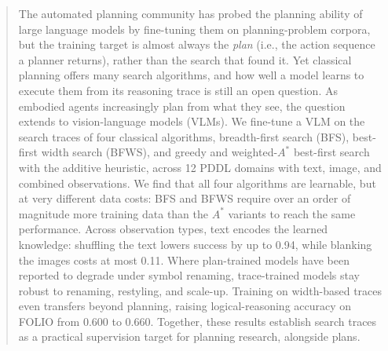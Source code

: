 \begin{abstract}
The automated planning community has probed the planning ability of large language models by fine-tuning them on planning-problem corpora, but the training target is almost always the \emph{plan} (i.e., the action sequence a planner returns), rather than the search that found it. Yet classical planning offers many search algorithms, and how well a model learns to execute them from its reasoning trace is still an open question. As embodied agents increasingly plan from what they see, the question extends to vision-language models (VLMs). We fine-tune a VLM on the search traces of four classical algorithms, breadth-first search (BFS), best-first width search (BFWS), and greedy and weighted-$A^*$ best-first search with the additive heuristic, across 12 PDDL domains with text, image, and combined observations. We find that all four algorithms are learnable, but at very different data costs: BFS and BFWS require over an order of magnitude more training data than the $A^*$ variants to reach the same performance. Across observation types, text encodes the learned knowledge: shuffling the text lowers success by up to 0.94, while blanking the images costs at most 0.11. Where plan-trained models have been reported to degrade under symbol renaming, trace-trained models stay robust to renaming, restyling, and scale-up. Training on width-based traces even transfers beyond planning, raising logical-reasoning accuracy on FOLIO from 0.600 to 0.660. Together, these results establish search traces as a practical supervision target for planning research, alongside plans.
\end{abstract}
